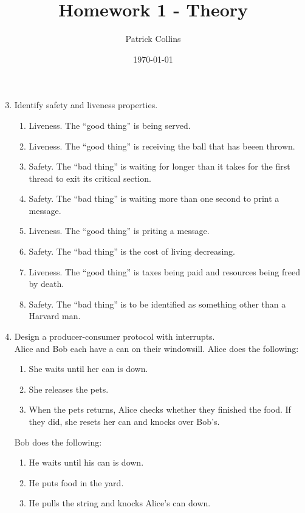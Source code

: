 \documentclass{article}
\begin{document}
\title{Homework 1 - Theory}
\author{Patrick Collins}
\date{\today}
\maketitle

\begin{enumerate}
\setcounter{enumi}{2}

\item Identify safety and liveness properties. 
  \begin{enumerate}
  \item Liveness. The ``good thing'' is being served.
  \item Liveness. The ``good thing'' is receiving the ball that has
    beeen thrown.
  \item Safety. The ``bad thing'' is waiting for longer than it takes
    for the first thread to exit its critical section.
  \item Safety. The ``bad thing'' is waiting more than one second to
    print a message.
  \item Liveness. The ``good thing'' is priting a message.
  \item Safety. The ``bad thing'' is the cost of living decreasing.
  \item Liveness. The ``good thing'' is taxes being paid and resources
    being freed by death.
  \item Safety. The ``bad thing'' is to be identified as something
    other than a Harvard man.
  \end{enumerate}

\item Design a producer-consumer protocol with interrupts. \\
Alice and Bob each have a can on their windowsill. Alice does the following:
\begin{enumerate}
\item She waits until her can is down.
\item She releases the pets.
\item When the pets returns, Alice checks whether they finished the
  food. If they did, she resets her can and knocks over Bob's.\\
\end{enumerate}
Bob does the following:
\begin{enumerate}
\item He waits until his can is down.
\item He puts food in the yard.
\item He pulls the string and knocks Alice's can down.
\end{enumerate}


\end{enumerate}
\end{document}
